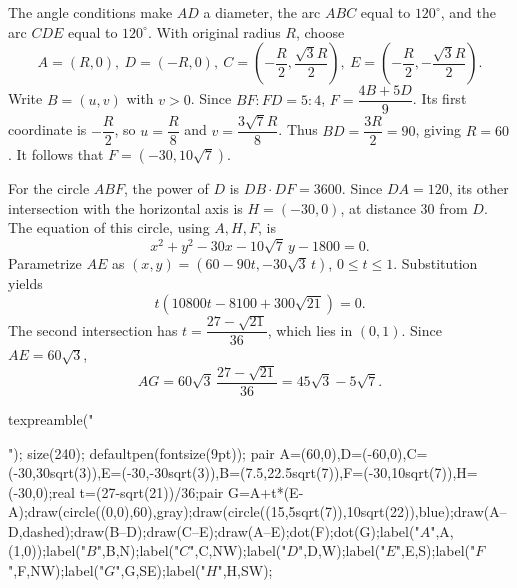 The angle conditions make $AD$ a diameter, the arc $ABC$ equal to $120^\circ$, and the arc $CDE$ equal to $120^\circ$. With original radius $R$, choose
\[
A=(R,0),\ D=(-R,0),\
C=(-\dfrac{R}{2},\dfrac{\sqrt3R}{2}),\
E=(-\dfrac{R}{2},-\dfrac{\sqrt3R}{2}).
\]
Write $B=(u,v)$ with $v>0$. Since $BF:FD=5:4$, $F=\dfrac{4B+5D}{9}$. Its first coordinate is $-\dfrac{R}{2}$, so $u=\dfrac{R}{8}$ and $v=\dfrac{3\sqrt7R}{8}$. Thus $BD=\dfrac{3R}{2}=90$, giving $R=60$. It follows that $F=(-30,10\sqrt7)$.

For the circle $ABF$, the power of $D$ is $DB\cdot DF=3600$. Since $DA=120$, its other intersection with the horizontal axis is $H=(-30,0)$, at distance $30$ from $D$. The equation of this circle, using $A,H,F$, is
\[
x^2+y^2-30x-10\sqrt7\,y-1800=0.
\]
Parametrize $AE$ as $(x,y)=(60-90t,-30\sqrt3\,t)$, $0\le t\le1$. Substitution yields
\[
t(10800t-8100+300\sqrt{21})=0.
\]
The second intersection has $t=\dfrac{27-\sqrt{21}}{36}$, which lies in $(0,1)$. Since $AE=60\sqrt3$,
\[
\boxed{AG=60\sqrt3\,\dfrac{27-\sqrt{21}}{36}=45\sqrt3-5\sqrt7}.
\]
\begin{asy}
texpreamble("\usepackage{amsmath,amssymb}");
size(240);
defaultpen(fontsize(9pt));
pair A=(60,0),D=(-60,0),C=(-30,30sqrt(3)),E=(-30,-30sqrt(3)),B=(7.5,22.5sqrt(7)),F=(-30,10sqrt(7)),H=(-30,0);real t=(27-sqrt(21))/36;pair G=A+t*(E-A);draw(circle((0,0),60),gray);draw(circle((15,5sqrt(7)),10sqrt(22)),blue);draw(A--D,dashed);draw(B--D);draw(C--E);draw(A--E);dot(F);dot(G);label("$A$",A,(1,0));label("$B$",B,N);label("$C$",C,NW);label("$D$",D,W);label("$E$",E,S);label("$F$",F,NW);label("$G$",G,SE);label("$H$",H,SW);
\end{asy}
